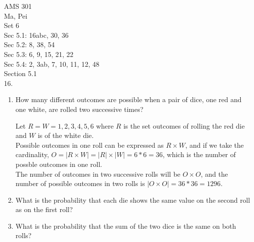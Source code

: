 \documentclass[12pt]{article}
\begin{document}
\noindent
AMS 301\\
Ma, Pei \\
Set 6\\

Sec 5.1: 16abc, 30, 36\\
Sec 5.2: 8, 38, 54\\
Sec 5.3: 6, 9, 15, 21, 22\\ 
Sec 5.4: 2, 3ab, 7, 10, 11, 12, 48\\

Section 5.1\\
16. \begin{enumerate}[label=(\alph*)]
    \item How many different outcomes are possible when 
    a pair of dice, one red and one white, 
    are rolled two successive times? 
    \begin{solution}
        Let $R = W = {1, 2, 3, 4, 5, 6}$ where $R$ is the set 
        outcomes of rolling the red die and $W$ is of the white die.\\
        Possible outcomes in one roll can be expressed as $R \times W$, 
        and if we take the cardinality, $O=|R\times W| = |R| \times |W|
        =6*6=36$, which is the number of possble outcomes in one roll.\\
        The number of outcomes in two successive rolls will be 
        $O\times O$, and the number of possible outcomes in two rolls 
        is $|O\times O|=36*36 = 1296$. 
    \end{solution}
    \item What is the probability that each die shows the 
    same value on the second roll as on the first roll? 
    \begin{solution}
        
    \end{solution}
    \item What is the probability that the sum of the 
    two dice is the same on both rolls? 
\end{enumerate}
\end{document}
